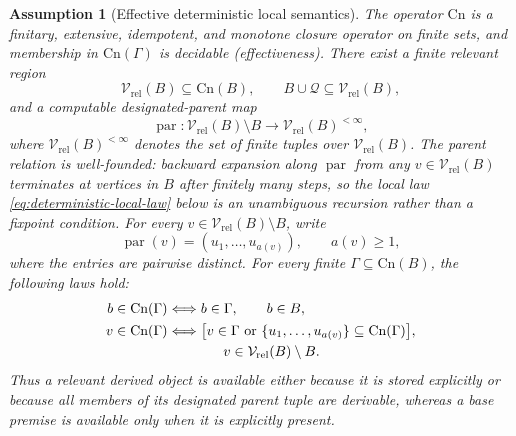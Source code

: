 \documentclass[journal]{IEEEtran}
\newcommand{\Cn}{\text{Cn}}
\newtheorem{assumption}{Assumption}[section]
\numberwithin{equation}{section}
\begin{document}
\begin{assumption}[Effective deterministic local semantics]
\label{assump:det-local}
The operator \(\Cn\) is a finitary, extensive, idempotent, and monotone
closure operator on finite sets, and membership in \(\Cn(\Gamma)\) is
decidable (effectiveness).  There exist a finite relevant region
\[
  \mathcal V_{\mathrm{rel}}(B)\subseteq\Cn(B),
  \qquad
  B\cup\mathcal Q\subseteq\mathcal V_{\mathrm{rel}}(B),
\]
and a computable designated-parent map
\[
  \operatorname{par}:
  \mathcal V_{\mathrm{rel}}(B)\setminus B
  \longrightarrow
  \mathcal V_{\mathrm{rel}}(B)^{<\infty},
\]
where \(\mathcal V_{\mathrm{rel}}(B)^{<\infty}\) denotes the set of finite
tuples over \(\mathcal V_{\mathrm{rel}}(B)\).  The parent relation is
well-founded: backward expansion along \(\operatorname{par}\) from any
\(v\in\mathcal V_{\mathrm{rel}}(B)\) terminates at vertices in \(B\) after
finitely many steps, so the local law \eqref{eq:deterministic-local-law}
below is an unambiguous recursion rather than a fixpoint condition.
For every
\(v\in\mathcal V_{\mathrm{rel}}(B)\setminus B\), write
\[
  \operatorname{par}(v)
  =
  (u_1,\ldots,u_{a(v)}),
  \qquad a(v)\ge 1,
\]
where the entries are pairwise distinct.  For every finite
\(\Gamma\subseteq\Cn(B)\), the following laws hold:
\begin{align}
  b\in\Cn(\Gamma) &\Longleftrightarrow b\in\Gamma, \qquad b\in B, \label{eq:base-irreducibility}\\
  v\in\Cn(\Gamma) &\Longleftrightarrow 
    \bigl[v\in\Gamma \text{ or } \{u_1,\ldots,u_{a(v)}\}\subseteq\Cn(\Gamma)\bigr], \notag\\
  &\qquad\qquad v\in\mathcal V_{\mathrm{rel}}(B)\setminus B. \label{eq:deterministic-local-law}
\end{align}
Thus a relevant derived object is available either because it is stored
explicitly or because all members of its designated parent tuple are
derivable, whereas a base premise is available only when it is explicitly
present.
\end{assumption}
\end{document}
